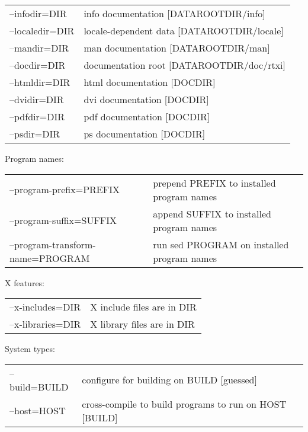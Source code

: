 \begin{maxipage}
\begin{example}
\begin{tabular}{ll}
--infodir=DIR        &     info documentation [DATAROOTDIR/info]\\
--localedir=DIR   &        locale-dependent data [DATAROOTDIR/locale]\\
--mandir=DIR     &         man documentation [DATAROOTDIR/man]\\
--docdir=DIR      &        documentation root [DATAROOTDIR/doc/rtxi]\\
--htmldir=DIR     &        html documentation [DOCDIR]\\
--dvidir=DIR       &       dvi documentation [DOCDIR]\\
--pdfdir=DIR      &        pdf documentation [DOCDIR]\\
--psdir=DIR      &         ps documentation [DOCDIR]
\end{tabular}

Program names:\\ \vspace{.4cm}
\begin{tabular}{ll}
--program-prefix=PREFIX    &          prepend PREFIX to installed program names\\
--program-suffix=SUFFIX      &        append SUFFIX to installed program names\\
--program-transform-name=PROGRAM   &  run sed PROGRAM on installed program names
\end{tabular}

X features:\\ \vspace{.4cm}
\begin{tabular}{ll}
--x-includes=DIR   &   X include files are in DIR\\
--x-libraries=DIR  &   X library files are in DIR
\end{tabular}

System types:\\ \vspace{.4cm}
\begin{tabular}{ll}
--build=BUILD    &   configure for building on BUILD [guessed]\\
--host=HOST     &    cross-compile to build programs to run on HOST [BUILD]
\end{tabular}


\end{example}
\end{maxipage}
